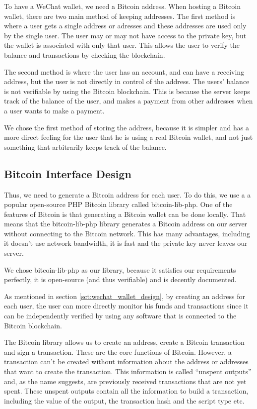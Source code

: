 To have a WeChat wallet, we need a Bitcoin address. When hosting a Bitcoin wallet, there are two main method of keeping addresses. The first method is where a user gets a single address or adresses and these addresses are used only by the single user. The user may or may not have access to the private key, but the wallet is associated with only that user. This allows the user to verify the balance and transactions by checking the blockchain. 

The second method is where the user has an account, and can have a receiving address, but the user is not directly in control of the address. The users' balance is not verifiable by using the Bitcoin blockchain. This is because the server keeps track of the balance of the user, and makes a payment from other addresses when a user wants to make a payment.

We chose the first method of storing the address, because it is simpler and has a more direct feeling for the user that he is using a real Bitcoin wallet, and not just something that arbitrarily keeps track of the balance.

\subsection{Bitcoin Interface Design}
\label{sct:bitcoin_interface_design}

Thus, we need to generate a Bitcoin address for each user. To do this, we use a a popular open-source PHP Bitcoin library called bitcoin-lib-php. One of the features of Bitcoin is that generating a Bitcoin wallet can be done locally. That means that the bitcoin-lib-php library generates a Bitcoin address on our server without connecting to the Bitcoin network. This has many advantages, including it doesn't use network bandwidth, it is fast and the private key never leaves our server.

We chose bitcoin-lib-php as our library, because it satisfies our requirements perfectly, it is open-source (and thus verifiable) and is decently documented. 

As mentioned in section \ref{sct:wechat_wallet_design}, by creating an address for each user, the user can more directly monitor his funds and transactions since it can be independently verified by using any software that is connected to the Bitcoin blockchain.

The Bitcoin library allows us to create an address, create a Bitcoin transaction and sign a transaction. These are the core functions of Bitcoin. However, a transaction can't be created without information about the address or addresses that want to create the transaction. This information is called ``unspent outputs'' and, as the name suggests, are previously received transactions that are not yet spent. These unspent outputs contain all the information to build a transaction, including the value of the output, the transaction hash and the script type etc.

